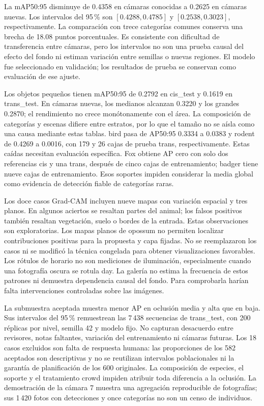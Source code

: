 La mAP50:95 disminuye de 0.4358 en cámaras conocidas a 0.2625 en cámaras nuevas.
Los intervalos del 95\,\% son $[0.4288,0.4785]$ y $[0.2538,0.3023]$,
respectivamente. La comparación con trece categorías comunes conserva una brecha
de 18.08 puntos porcentuales. Es consistente con dificultad de transferencia
entre cámaras, pero los intervalos no son una prueba causal del efecto del fondo
ni estiman variación entre semillas o nuevas regiones. El modelo fue seleccionado
en validación; los resultados de prueba se conservan como evaluación de ese ajuste.

Los objetos pequeños tienen mAP50:95 de 0.2792 en cis\_test y 0.1619 en trans\_test.
En cámaras nuevas, los medianos alcanzan 0.3220 y los grandes 0.2870; el rendimiento
no crece monótonamente con el área. La composición de categorías y escenas difiere
entre estratos, por lo que el tamaño no se aísla como una causa mediante estas tablas.
bird pasa de AP50:95 0.3334 a 0.0383 y rodent de 0.4269 a 0.0016, con 179 y 26
cajas de prueba trans, respectivamente. Estas caídas necesitan evaluación específica.
Fox obtiene AP cero con solo dos referencias cis y una trans, después de cinco cajas
de entrenamiento; badger tiene nueve cajas de entrenamiento. Esos soportes impiden
considerar la media global como evidencia de detección fiable de categorías raras.

Los doce casos Grad-CAM incluyen nueve mapas con variación espacial y tres planos.
En algunos aciertos se resaltan partes del animal; los falsos positivos también
resaltan vegetación, suelo o bordes de la entrada. Estas observaciones son exploratorias.
Los mapas planos de opossum no permiten localizar contribuciones positivas para
la propuesta y capa fijadas. No se reemplazaron los casos ni se modificó la técnica
congelada para obtener visualizaciones favorables. Los rótulos de horario no son
mediciones de iluminación, especialmente cuando una fotografía oscura se rotula day.
La galería no estima la frecuencia de estos patrones ni demuestra dependencia causal
del fondo. Para comprobarla harían falta intervenciones controladas sobre las imágenes.

La submuestra aceptada muestra menor AP en oclusión media y alta que en baja.
Sus intervalos del 95\,\% remuestrean las 7\,438 secuencias de trans\_test, con
200 réplicas por nivel, semilla 42 y modelo fijo. No capturan desacuerdo entre
revisores, notas faltantes, variación del entrenamiento ni cámaras futuras.
Los 18 casos excluidos son falta de respuesta humana: las proporciones de los
582 aceptados son descriptivas y no se reutilizan intervalos poblacionales ni
la garantía de planificación de los 600 originales. La composición de especies,
el soporte y el tratamiento crowd impiden atribuir toda diferencia a la oclusión.
La demostración de la cámara 7 muestra una agregación reproducible de fotografías;
sus 1\,420 fotos con detecciones y once categorías no son un censo de individuos.

